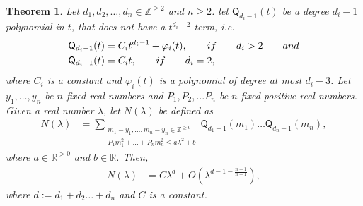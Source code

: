\documentclass[11pt,lettersize,reqno,fullpage]{amsart}
\newtheorem{thm}{Theorem}[section]
\begin{document}
\begin{thm}
\label{Auxiliary_result}
Let $d_1, d_2, \ldots, d_n \in \mathbb{Z}^{\geq 2}$ and $n\geq 2$. 
let $\mathsf{Q}_{d_i-1}(t)$ be a degree $d_i-1$ polynomial in $t$, 
that does not have a $t^{d_i-2}$ term, i.e.  
\begin{align}
\mathsf{Q}_{d_i-1}(t) & = C_i t^{d_i-1} + \varphi_i(t), \qquad \textnormal{if} \qquad d_i>2 \qquad \textnormal{and} \nonumber \\ 
\mathsf{Q}_{d_i-1}(t) & = C_i t, \qquad \textnormal{if} \qquad d_i=2,\label{Q_condt_ag}
\end{align}
where $C_i$ is a constant and $\varphi_i(t)$ is a polynomial of degree at most $d_i-3$.  
Let $y_1, \ldots, y_n$ be $n$ fixed real numbers and 
$P_1, P_2, \ldots P_n$ be $n$ fixed positive real numbers. 
Given a real number $\lambda$, let $N(\lambda)$ be defined as   
\begin{align}
N(\lambda) & = \sum_{\substack{m_1-y_1, \ldots, m_n-y_n \in \mathbb{Z}^{\geq 0}\\ P_1 m_1^2 + \ldots + P_n m_n^2 \leq a \lambda^2 + b}}
\mathsf{Q}_{d_1-1}(m_1) \ldots \mathsf{Q}_{d_n-1}(m_n),
\end{align} 
where $a \in \mathbb{R}^{>0}$ and $b \in \mathbb{R}$. Then,  
\begin{align}
N(\lambda) & = C \lambda^{d} + O(\lambda^{d-1-\frac{n-1}{n+1}}),
\end{align}
where $d:= d_1 + d_2 \ldots + d_n$ and $C$ is a constant.
\end{thm} 
\end{document}
